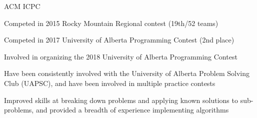 \begin{cventries}
  \cventry
    {}
    {ACM ICPC}
    {}
    {}
    {
      \begin{cvitems}
      \item {Competed in 2015 Rocky Mountain Regional contest (19th/52 teams)}
      \item {Competed in 2017 University of Alberta Programming Contest (2nd place)}
      \item {Involved in organizing the 2018 University of Alberta Programming Contest}
      \item {Have been consistently involved with the University of Alberta Problem Solving Club (UAPSC),
        and have been involved in multiple practice contests}
      \item {Improved skills at breaking down problems and applying known solutions to sub-problems, and provided
        a breadth of experience implementing algorithms}
      \end{cvitems}
    }

\end{cventries}
